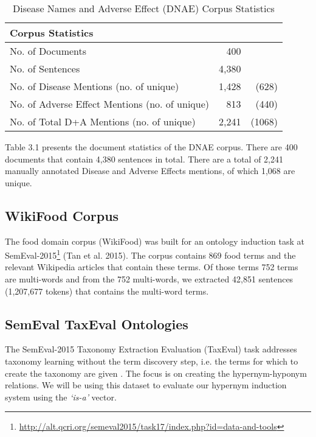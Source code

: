 \begin{table}[H]
\centering
    \begin{tabular}{lrr}
    \textbf{Corpus Statistics}                                              & ~          \\ \hline
    No. of Documents                               & 400     &~   \\
    No. of Sentences                               & 4,380    &~   \\
    No. of Disease Mentions  (no. of unique)       & 1,428 &(628) \\
    No. of Adverse Effect Mentions (no. of unique) & 813 &(440)  \\
    No. of Total D+A Mentions (no. of unique) & 2,241 &(1068)  \\
    \end{tabular}
\caption{Disease Names and Adverse Effect (DNAE) Corpus Statistics}
\label{table:dnae}
\end{table}

Table 3.1 presents the document statistics of the DNAE corpus. There are 400 documents that contain 4,380 sentences in total. There are a total of 2,241 manually annotated Disease and Adverse Effects mentions, of which 1,068 are unique. 


\subsection{WikiFood Corpus}

The food domain corpus (WikiFood) was built for an ontology induction task at SemEval-2015\footnote{\url{http://alt.qcri.org/semeval2015/task17/index.php?id=data-and-tools}} (Tan et al. 2015). The corpus contains 869 food terms and the relevant Wikipedia articles that contain these terms. Of those terms 752 terms are multi-words and from the 752 multi-words, we extracted 42,851 sentences (1,207,677 tokens) that contains the multi-word terms. 

\subsection{SemEval TaxEval Ontologies}

The SemEval-2015 Taxonomy Extraction Evaluation (TaxEval) task addresses taxonomy learning without the term discovery step, i.e. the terms for which to create the taxonomy are given \citep{task17semeval2015}. The focus is on creating the hypernym-hyponym relations. We will be using this dataset to evaluate our hypernym induction system using the \textit{`is-a'} vector.

